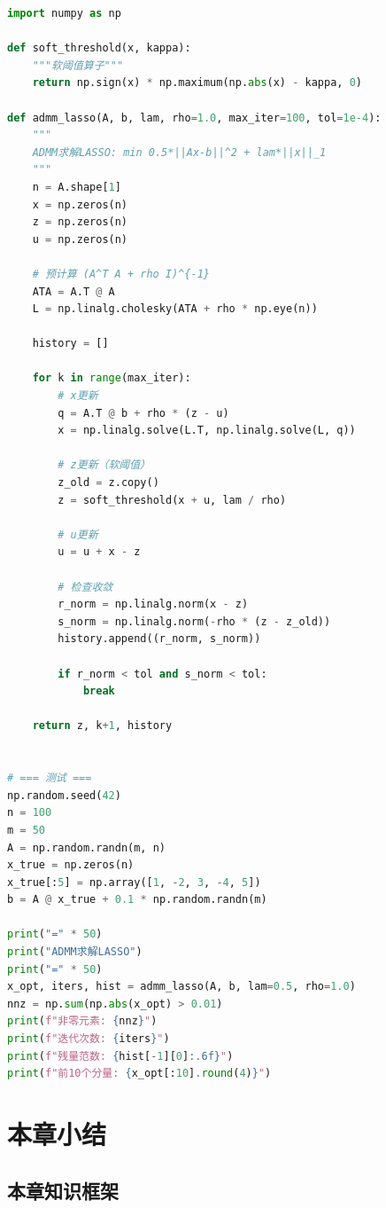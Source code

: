 \begin{lstlisting}[language=Python, caption=ADMM与邻近算法实现]
import numpy as np

def soft_threshold(x, kappa):
    """软阈值算子"""
    return np.sign(x) * np.maximum(np.abs(x) - kappa, 0)

def admm_lasso(A, b, lam, rho=1.0, max_iter=100, tol=1e-4):
    """
    ADMM求解LASSO: min 0.5*||Ax-b||^2 + lam*||x||_1
    """
    n = A.shape[1]
    x = np.zeros(n)
    z = np.zeros(n)
    u = np.zeros(n)
    
    # 预计算 (A^T A + rho I)^{-1}
    ATA = A.T @ A
    L = np.linalg.cholesky(ATA + rho * np.eye(n))
    
    history = []
    
    for k in range(max_iter):
        # x更新
        q = A.T @ b + rho * (z - u)
        x = np.linalg.solve(L.T, np.linalg.solve(L, q))
        
        # z更新（软阈值）
        z_old = z.copy()
        z = soft_threshold(x + u, lam / rho)
        
        # u更新
        u = u + x - z
        
        # 检查收敛
        r_norm = np.linalg.norm(x - z)
        s_norm = np.linalg.norm(-rho * (z - z_old))
        history.append((r_norm, s_norm))
        
        if r_norm < tol and s_norm < tol:
            break
    
    return z, k+1, history


# === 测试 ===
np.random.seed(42)
n = 100
m = 50
A = np.random.randn(m, n)
x_true = np.zeros(n)
x_true[:5] = np.array([1, -2, 3, -4, 5])
b = A @ x_true + 0.1 * np.random.randn(m)

print("=" * 50)
print("ADMM求解LASSO")
print("=" * 50)
x_opt, iters, hist = admm_lasso(A, b, lam=0.5, rho=1.0)
nnz = np.sum(np.abs(x_opt) > 0.01)
print(f"非零元素: {nnz}")
print(f"迭代次数: {iters}")
print(f"残量范数: {hist[-1][0]:.6f}")
print(f"前10个分量: {x_opt[:10].round(4)}")
\end{lstlisting}

\section{本章小结}\label{sec:ch7-summary}

\subsection{本章知识框架}

